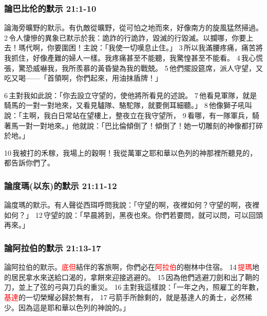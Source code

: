 \subsubsection{論巴比伦的默示 21:1-10}
論海旁曠野的默示。有仇敵從曠野，從可怕之地而來，好像南方的旋風猛然掃過。 2 令人悽慘的異象已默示於我：詭詐的行詭詐，毀滅的行毀滅。以攔哪，你要上去！瑪代啊，你要圍困！主說：「我使一切嘆息止住。」 3 所以我滿腰疼痛，痛苦將我抓住，好像產難的婦人一樣。我疼痛甚至不能聽，我驚惶甚至不能看。 4 我心慌張，驚恐威嚇我，我所羨慕的黃昏變為我的戰兢。 5 他們擺設筵席，派人守望，又吃又喝——「首領啊，你們起來，用油抹盾牌！」 

6 主對我如此說：「你去設立守望的，使他將所看見的述說。 7 他看見軍隊，就是騎馬的一對一對地來，又看見驢隊、駱駝隊，就要側耳細聽。」 8 他像獅子吼叫說：「主啊，我白日常站在望樓上，整夜立在我守望所， 9 看哪，有一隊軍兵，騎著馬一對一對地來。」他就說：「巴比倫傾倒了！傾倒了！她一切雕刻的神像都打碎於地。」

10 我被打的禾稼，我場上的穀啊！我從萬軍之耶和華以色列的神那裡所聽見的，都告訴你們了。

\subsubsection{論度瑪(以东)的默示 21:11-12}
論度瑪的默示。有人聲從西珥呼問我說：「守望的啊，夜裡如何？守望的啊，夜裡如何？」 12 守望的說：「早晨將到，黑夜也來。你們若要問，就可以問，可以回頭再來。」

\subsubsection{論阿拉伯的默示 21:13-17}
論阿拉伯的默示。\textcolor{red}{底但}結伴的客旅啊，你們必在\textcolor{red}{阿拉伯}的樹林中住宿。 14 \textcolor{red}{提瑪}地的居民拿水來送給口渴的，拿餅來迎接逃避的。 15 因為他們逃避刀劍和出了鞘的刀，並上了弦的弓與刀兵的重災。 16 主對我這樣說：「一年之內，照雇工的年數，\textcolor{red}{基達}的一切榮耀必歸於無有， 17 弓箭手所餘剩的，就是基達人的勇士，必然稀少。因為這是耶和華以色列的神說的。」


